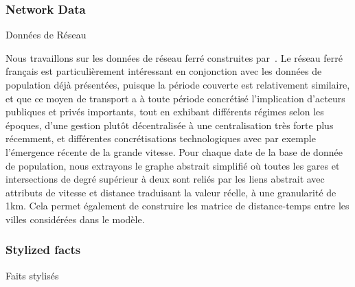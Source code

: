 \subsubsection{Network Data}{Données de Réseau}

Nous travaillons sur les données de réseau ferré construites par~\cite{thevenin2013mapping}. Le réseau ferré français est particulièrement intéressant en conjonction avec les données de population déjà présentées, puisque la période couverte est relativement similaire, et que ce moyen de transport a à toute période concrétisé l'implication d'acteurs publiques et privés importants, tout en exhibant différents régimes selon les époques, d'une gestion plutôt décentralisée à une centralisation très forte plus récemment, et différentes concrétisations technologiques avec par exemple l'émergence récente de la grande vitesse. Pour chaque date de la base de donnée de population, nous extrayons le graphe abstrait simplifié où toutes les gares et intersections de degré supérieur à deux sont reliés par les liens abstrait avec attributs de vitesse et distance traduisant la valeur réelle, à une granularité de 1km. Cela permet également de construire les matrice de distance-temps entre les villes considérées dans le modèle.





\subsubsection{Stylized facts}{Faits stylisés}


